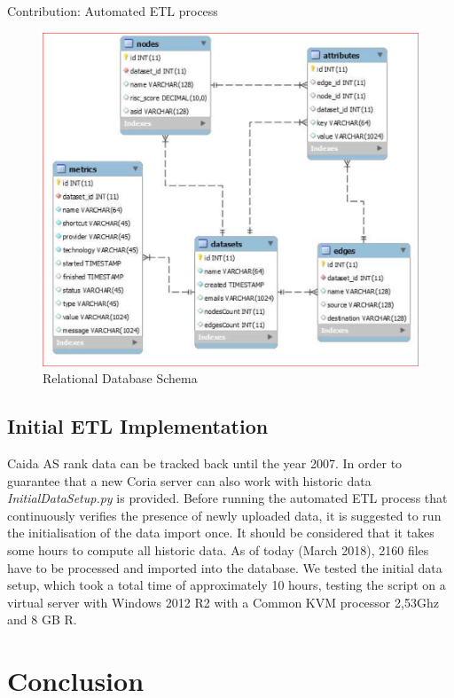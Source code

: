 \documentclass[conference, 11pt]{IEEEtran}
\begin{document}
\begin{subsection}{Contribution: Automated ETL process}
\vspace{0.5cm}
\begin{figure}[htbp]
\centerline{\includegraphics[scale=0.33]{Graphics/SQL_schema.PNG}}
\caption{Relational Database Schema}
\label{fig:SQL_schema}
\end{figure}
\vspace{0.5cm}

\end{subsection}

\subsection{Initial ETL Implementation}
Caida AS rank data can be tracked back until the year 2007. In order to guarantee that a new Coria server can also work with historic data \textit{InitialDataSetup.py} is provided. Before running the automated ETL process that continuously verifies the presence of newly uploaded data, it is suggested to run the initialisation of the data import once. It should be considered that it takes some hours to compute all historic data. As of today (March 2018), 2160 files have to be processed and imported into the database. We tested the initial data setup, which took a total time of approximately 10 hours, testing the script on a virtual server with Windows 2012 R2 with a Common KVM processor 2,53Ghz and 8 GB R.  




\section{Conclusion}
\end{document}
